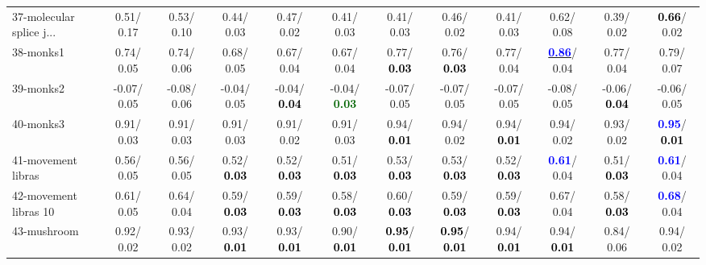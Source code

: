 \begin{table}[h]
\begin{center}
{\begin{tabular}{lc|c|c|c|c|c|c|c|c|c|c}
37-molecular splice j... &   0.51/  0.17 &   0.53/  0.10 &   0.44/  0.03 &   0.47/  0.02 &   0.41/  0.03 &   0.41/  0.03 &   0.46/  0.02 &   0.41/  0.03 &   0.62/  0.08 &   0.39/  0.02 & \textcolor{black}{\textbf{  0.66}}/  0.02 \\
38-monks1 &   0.74/  0.05 &   0.74/  0.06 &   0.68/  0.05 &   0.67/  0.04 &   0.67/  0.04 &   0.77/\textcolor{black}{\textbf{  0.03}} &   0.76/\textcolor{black}{\textbf{  0.03}} &   0.77/  0.04 & \underline{\textcolor{blue}{\textbf{  0.86}}}/  0.04 &   0.77/  0.04 &   0.79/  0.07 \\
39-monks2 &  -0.07/  0.05 &  -0.08/  0.06 &  -0.04/  0.05 &  -0.04/\textcolor{black}{\textbf{  0.04}} &  -0.04/\textcolor{darkgreen}{\textbf{  0.03}} &  -0.07/  0.05 &  -0.07/  0.05 &  -0.07/  0.05 &  -0.08/  0.05 &  -0.06/\textcolor{black}{\textbf{  0.04}} &  -0.06/  0.05 \\ \hline
40-monks3 &   0.91/  0.03 &   0.91/  0.03 &   0.91/  0.03 &   0.91/  0.02 &   0.91/  0.03 &   0.94/\textcolor{black}{\textbf{  0.01}} &   0.94/  0.02 &   0.94/\textcolor{black}{\textbf{  0.01}} &   0.94/  0.02 &   0.93/  0.02 & \textcolor{blue}{\textbf{  0.95}}/\textcolor{black}{\textbf{  0.01}} \\
41-movement libras &   0.56/  0.05 &   0.56/  0.05 &   0.52/\textcolor{black}{\textbf{  0.03}} &   0.52/\textcolor{black}{\textbf{  0.03}} &   0.51/\textcolor{black}{\textbf{  0.03}} &   0.53/\textcolor{black}{\textbf{  0.03}} &   0.53/\textcolor{black}{\textbf{  0.03}} &   0.52/\textcolor{black}{\textbf{  0.03}} & \textcolor{blue}{\textbf{  0.61}}/  0.04 &   0.51/\textcolor{black}{\textbf{  0.03}} & \textcolor{blue}{\textbf{  0.61}}/  0.04 \\
42-movement libras 10 &   0.61/  0.05 &   0.64/  0.04 &   0.59/\textcolor{black}{\textbf{  0.03}} &   0.59/\textcolor{black}{\textbf{  0.03}} &   0.58/\textcolor{black}{\textbf{  0.03}} &   0.60/\textcolor{black}{\textbf{  0.03}} &   0.59/\textcolor{black}{\textbf{  0.03}} &   0.59/\textcolor{black}{\textbf{  0.03}} &   0.67/  0.04 &   0.58/\textcolor{black}{\textbf{  0.03}} & \textcolor{blue}{\textbf{  0.68}}/  0.04 \\
43-mushroom &   0.92/  0.02 &   0.93/  0.02 &   0.93/\textcolor{black}{\textbf{  0.01}} &   0.93/\textcolor{black}{\textbf{  0.01}} &   0.90/\textcolor{black}{\textbf{  0.01}} & \textcolor{black}{\textbf{  0.95}}/\textcolor{black}{\textbf{  0.01}} & \textcolor{black}{\textbf{  0.95}}/\textcolor{black}{\textbf{  0.01}} &   0.94/\textcolor{black}{\textbf{  0.01}} &   0.94/\textcolor{black}{\textbf{  0.01}} &   0.84/  0.06 &   0.94/  0.02 \\

\end{tabular}}
\end{center}
\end{table}
